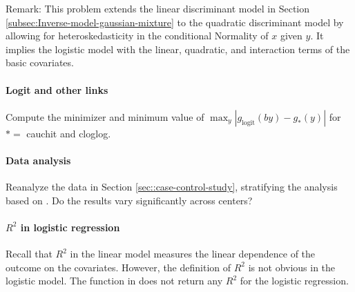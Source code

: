 Remark: This problem extends the linear discriminant model in Section \ref{subsec:Inverse-model-gaussian-mixture} to the quadratic discriminant model by allowing for heteroskedasticity in the conditional Normality of $x$ given $y$. It implies the logistic model with the linear, quadratic, and interaction terms of the basic covariates. 


\paragraph{Logit and other links}\label{hw17::logit-other-links}

Compute the minimizer and minimum value of $ \max_y | g_{\text{logit}}(by) - g_{*}(y) |$ for $* = $ cauchit and cloglog. 


 



\paragraph{Data analysis}\label{hw17::case-control-data-analysis}

Reanalyze the data in Section \ref{sec::case-control-study}, stratifying the analysis based on . Do the results vary significantly across centers?




\paragraph{$R^2$ in logistic regression}\label{hw17::r2-logistic}


Recall that $R^2$ in the linear model measures the linear dependence of the outcome on the covariates. 
However, the definition of $R^2$ is not obvious in the logistic model. The  function in  does not return any $R^2$ for the logistic regression. 

